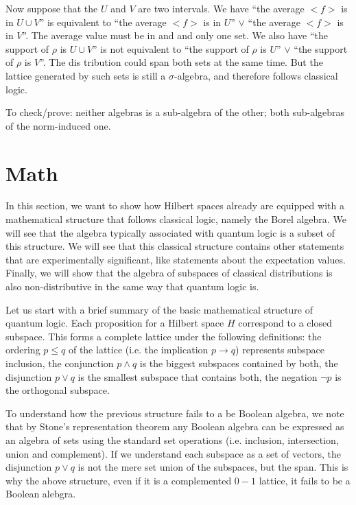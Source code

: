 \documentclass[10pt,twocolumn, nofootinbib]{revtex4-1}
\begin{document}
Now suppose that the $U$ and $V$ are two intervals. We have ``the average $<f>$ is in $U \cup V$'' is  equivalent to ``the average $<f>$ is in $U$'' $\vee$ ``the average $<f>$ is in $V$''. The average value must be in and and only one set. We also have ``the support of $\rho$ is $U \cup V$'' is not equivalent to ``the support of $\rho$ is $U$'' $\vee$ ``the support of $\rho$ is $V$''. The dis tribution could span both sets at the same time. But the lattice generated by such sets is still a $\sigma$-algebra, and therefore follows classical logic.

To check/prove: neither algebras is a sub-algebra of the other; both sub-algebras of the norm-induced one.

\section{Math}

In this section, we want to show how Hilbert spaces already are equipped with a mathematical structure that follows classical logic, namely the Borel algebra. We will see that the algebra typically associated with quantum logic is a subset of this structure. We will see that this classical structure contains other statements that are experimentally significant, like statements about the expectation values. Finally, we will show that the algebra of subspaces of classical distributions is also non-distributive in the same way that quantum logic is.

Let us start with a brief summary of the basic mathematical structure of quantum logic. Each proposition for a Hilbert space $H$ correspond to a closed subspace. This forms a complete lattice under the following definitions: the ordering $p \leq q$ of the lattice (i.e. the implication $p \to q$) represents subspace inclusion, the conjunction $p \wedge q$ is the biggest subspaces contained by both, the disjunction $p \vee q$ is the smallest subspace that contains both, the negation $\neg p$ is the orthogonal subspace.

To understand how the previous structure fails to a be Boolean algebra, we note that by Stone's representation theorem any Boolean algebra can be expressed as an algebra of sets using the standard set operations (i.e. inclusion, intersection, union and complement). If we understand each subspace as a set of vectors, the disjunction $p \vee q$ is not the mere set union of the subspaces, but the span. This is why the above structure, even if it is a complemented $0-1$ lattice, it fails to be a Boolean alebgra.
\end{document}
